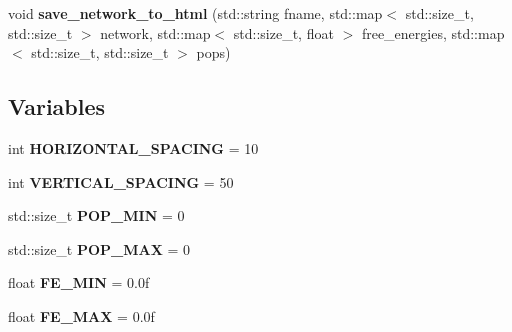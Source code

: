 \begin{DoxyCompactItemize}
\item 
\hypertarget{namespaceanonymous__namespace_02network__builder_8cpp_03_a5c4b925e83033f9ed41b21a0b1529631}{void {\bfseries save\-\_\-network\-\_\-to\-\_\-html} (std\-::string fname, std\-::map$<$ std\-::size\-\_\-t, std\-::size\-\_\-t $>$ network, std\-::map$<$ std\-::size\-\_\-t, float $>$ free\-\_\-energies, std\-::map$<$ std\-::size\-\_\-t, std\-::size\-\_\-t $>$ pops)}\label{namespaceanonymous__namespace_02network__builder_8cpp_03_a5c4b925e83033f9ed41b21a0b1529631}

\end{DoxyCompactItemize}
\subsection*{Variables}
\begin{DoxyCompactItemize}
\item 
\hypertarget{namespaceanonymous__namespace_02network__builder_8cpp_03_a5aad317185d6ac3d8e12505c7367d90f}{int {\bfseries H\-O\-R\-I\-Z\-O\-N\-T\-A\-L\-\_\-\-S\-P\-A\-C\-I\-N\-G} = 10}\label{namespaceanonymous__namespace_02network__builder_8cpp_03_a5aad317185d6ac3d8e12505c7367d90f}

\item 
\hypertarget{namespaceanonymous__namespace_02network__builder_8cpp_03_aa78ed52924f98ce4e118d5dafc59a4ff}{int {\bfseries V\-E\-R\-T\-I\-C\-A\-L\-\_\-\-S\-P\-A\-C\-I\-N\-G} = 50}\label{namespaceanonymous__namespace_02network__builder_8cpp_03_aa78ed52924f98ce4e118d5dafc59a4ff}

\item 
\hypertarget{namespaceanonymous__namespace_02network__builder_8cpp_03_aee93ace7a0db0da6376d7683784f81af}{std\-::size\-\_\-t {\bfseries P\-O\-P\-\_\-\-M\-I\-N} = 0}\label{namespaceanonymous__namespace_02network__builder_8cpp_03_aee93ace7a0db0da6376d7683784f81af}

\item 
\hypertarget{namespaceanonymous__namespace_02network__builder_8cpp_03_a9cbab237559e1dd8cbb85944008c0542}{std\-::size\-\_\-t {\bfseries P\-O\-P\-\_\-\-M\-A\-X} = 0}\label{namespaceanonymous__namespace_02network__builder_8cpp_03_a9cbab237559e1dd8cbb85944008c0542}

\item 
\hypertarget{namespaceanonymous__namespace_02network__builder_8cpp_03_a2062454e5f03c362b817d6e41a50a5f9}{float {\bfseries F\-E\-\_\-\-M\-I\-N} = 0.\-0f}\label{namespaceanonymous__namespace_02network__builder_8cpp_03_a2062454e5f03c362b817d6e41a50a5f9}

\item 
\hypertarget{namespaceanonymous__namespace_02network__builder_8cpp_03_ab9f112a82e30a89c15e77923e3a1c889}{float {\bfseries F\-E\-\_\-\-M\-A\-X} = 0.\-0f}\label{namespaceanonymous__namespace_02network__builder_8cpp_03_ab9f112a82e30a89c15e77923e3a1c889}

\end{DoxyCompactItemize}
